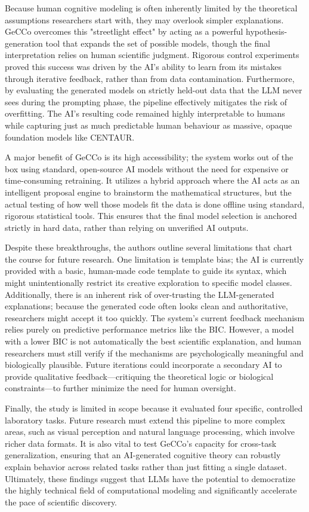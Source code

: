 Because human cognitive modeling is often inherently limited by the theoretical assumptions researchers start with, they may overlook simpler explanations. GeCCo overcomes this "streetlight effect" by acting as a powerful hypothesis-generation tool that expands the set of possible models, though the final interpretation relies on human scientific judgment. Rigorous control experiments proved this success was driven by the AI's ability to learn from its mistakes through iterative feedback, rather than from data contamination. Furthermore, by evaluating the generated models on strictly held-out data that the LLM never sees during the prompting phase, the pipeline effectively mitigates the risk of overfitting. The AI's resulting code remained highly interpretable to humans while capturing just as much predictable human behaviour as massive, opaque foundation models like CENTAUR.

A major benefit of GeCCo is its high accessibility; the system works out of the box using standard, open-source AI models without the need for expensive or time-consuming retraining. It utilizes a hybrid approach where the AI acts as an intelligent proposal engine to brainstorm the mathematical structures, but the actual testing of how well those models fit the data is done offline using standard, rigorous statistical tools. This ensures that the final model selection is anchored strictly in hard data, rather than relying on unverified AI outputs. 

Despite these breakthroughs, the authors outline several limitations that chart the course for future research. One limitation is template bias; the AI is currently provided with a basic, human-made code template to guide its syntax, which might unintentionally restrict its creative exploration to specific model classes. Additionally, there is an inherent risk of over-trusting the LLM-generated explanations; because the generated code often looks clean and authoritative, researchers might accept it too quickly. The system's current feedback mechanism relies purely on predictive performance metrics like the BIC. However, a model with a lower BIC is not automatically the best scientific explanation, and human researchers must still verify if the mechanisms are psychologically meaningful and biologically plausible. Future iterations could incorporate a secondary AI to provide qualitative feedback—critiquing the theoretical logic or biological constraints—to further minimize the need for human oversight. 

Finally, the study is limited in scope because it evaluated four specific, controlled laboratory tasks. Future research must extend this pipeline to more complex areas, such as visual perception and natural language processing, which involve richer data formats. It is also vital to test GeCCo's capacity for cross-task generalization, ensuring that an AI-generated cognitive theory can robustly explain behavior across related tasks rather than just fitting a single dataset. Ultimately, these findings suggest that LLMs have the potential to democratize the highly technical field of computational modeling and significantly accelerate the pace of scientific discovery.

